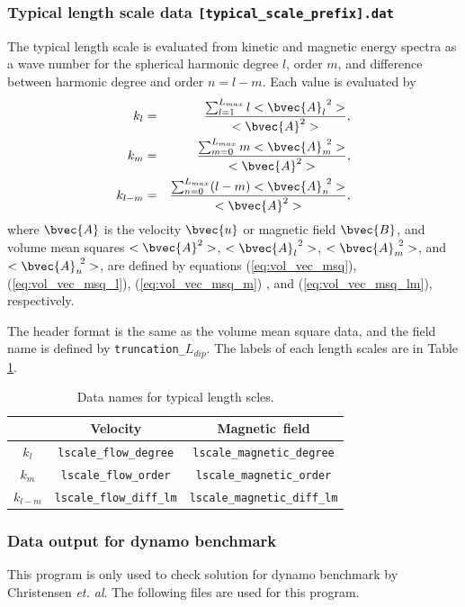 \subsubsection{Typical length scale data {\tt [typical\_scale\_prefix].dat}}
The typical length scale is evaluated from kinetic and magnetic energy spectra as a wave number for the spherical harmonic degree $l$, order $m$, and difference between harmonic degree and order $n = l-m$. Each value is evaluated by
%
\begin{eqnarray}
k_{l} & = & \frac{\sum_{l=1}^{L_{max}} l <\bvec{A}_{l}^{\ 2} >}{<\bvec{A}^{2} >},
\\
k_{m} & = & \frac{\sum_{m=0}^{L_{max}} m <\bvec{A}_{m}^{\ 2} >}{<\bvec{A}^{2} >}, 
\\
k_{l-m} & = & \frac{\sum_{n=0}^{L_{max}} (l-m) <\bvec{A}_{n}^{\ 2} >}{<\bvec{A}^{2} >},
\end{eqnarray}
%
where $\bvec{A}$ is the velocity $\bvec{u}$ or magnetic field $\bvec{B}$, and volume mean squares $<\bvec{A}^{2}>$, $<\bvec{A}_{l}^{\ 2}>$, $<\bvec{A}_{m}^{\ 2}>$, and $<\bvec{A}_{n}^{\ 2}>$, are defined by equations (\ref{eq:vol_vec_msq}), (\ref{eq:vol_vec_msq_l}), (\ref{eq:vol_vec_msq_m}) , and (\ref{eq:vol_vec_msq_lm}), respectively.

The header format is the same as the volume mean square data, and the field name is defined by {\tt truncation\_}$L_{dip}$. The labels of each length scales are in Table \ref{table:scale_name}.
%
\begin{table}[htp]
\caption{Data names for typical length scles.}
\begin{center}
\begin{tabular}{|c|c|c|}
\hline
 & \mbox{Velocity} & \mbox{Magnetic field} \\ \hline
$k_{l}$ & {\tt lscale\_flow\_degree} & {\tt lscale\_magnetic\_degree} \\
$k_{m}$ & {\tt lscale\_flow\_order} & {\tt lscale\_magnetic\_order} \\
$k_{l-m}$ & {\tt lscale\_flow\_diff\_lm} & {\tt lscale\_magnetic\_diff\_lm} 
\\ \hline 
\end{tabular}
\end{center}
\label{table:scale_name}
\end{table}%
%

\subsubsection{Data output for dynamo benchmark}
\label{section:check_bench}
This program is only used to check solution for dynamo benchmark by Christensen {\it et. al}. The following files are used for this program.

